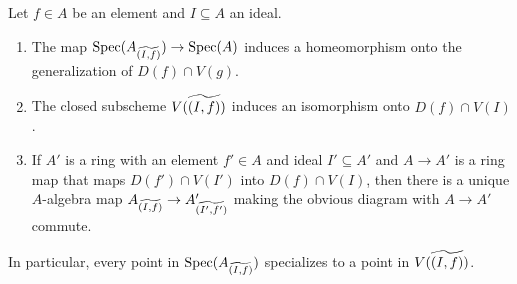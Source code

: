 \begin{lemma}[{\stacksproject{096V}}]
    \label{lemma:locally-closed-specializations}
    Let $f \in A$ be an element and $I \subseteq A$ an ideal.
    \begin{enumerate}
        \item The map $\mathrm{Spec}(A_{\widetilde{(I, f)}}) \to \mathrm{Spec}(A)$ induces
            a homeomorphism onto the generalization of $D(f) \cap V(g)$.
        \item The closed subscheme $V(\widetilde{(I, f)})$ induces an isomorphism
            onto $D(f) \cap V(I)$.
            \label{item:closed-subscheme-tilde}
        \item If $A'$ is a ring with an element $f' \in A$ and ideal $I' \subseteq A'$ and
            $A \to A'$ is a ring map that maps
            $D(f') \cap V(I')$ into $D(f) \cap V(I)$, then there is a unique $A$-algebra map
            $A_{\widetilde{(I, f)}} \to A'_{\widetilde{(I', f')}}$ making the obvious
            diagram with $A \to A'$ commute.
    \end{enumerate}
    In particular, every
    point in $\mathrm{Spec}(A_{\widetilde{(I, f)}})$ specializes to a point in $V(\widetilde{(I, f)})$.
    \leanok
\end{lemma}

